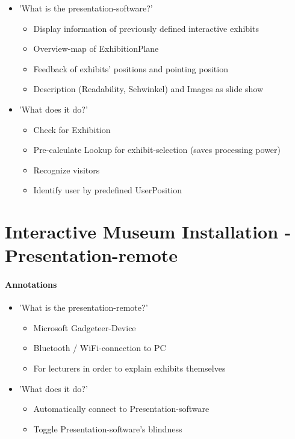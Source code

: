 \begin{itemize}
	\item 'What is the presentation-software?'
	\begin{itemize}
		\item Display information of previously defined interactive exhibits
		\item Overview-map of ExhibitionPlane
		\item Feedback of exhibits' positions and pointing position
		\item Description (Readability, Sehwinkel) and Images as slide show
	\end{itemize}
	\item 'What does it do?'
	\begin{itemize}
		\item Check for Exhibition
		\item Pre-calculate Lookup for exhibit-selection (saves processing power)
		\item Recognize visitors
		\item Identify user by predefined UserPosition 
	\end{itemize}
\end{itemize}



\section{Interactive Museum Installation - Presentation-remote}
\label{implementation_remote}

\paragraph{Annotations}

\begin{itemize}
	\item 'What is the presentation-remote?'
	\begin{itemize}
		\item Microsoft Gadgeteer-Device
		\item Bluetooth / WiFi-connection to PC
		\item For lecturers in order to explain exhibits themselves
	\end{itemize}
	\item 'What does it do?'
	\begin{itemize}
		\item Automatically connect to Presentation-software
		\item Toggle Presentation-software's blindness
	\end{itemize}
\end{itemize}



